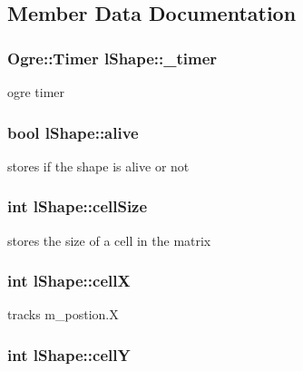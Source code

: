 \subsection{Member Data Documentation}
\hypertarget{classl_shape_a04043b68e92f96f681a82cbcaea48663}{
\subsubsection[{\-\_\-timer}]{\setlength{\rightskip}{0pt plus 5cm}Ogre\-::\-Timer l\-Shape\-::\-\_\-timer}}\label{classl_shape_a04043b68e92f96f681a82cbcaea48663}
ogre timer \hypertarget{classl_shape_ab9c57360b754bd499a55074a29437f5e}{
\subsubsection[{alive}]{\setlength{\rightskip}{0pt plus 5cm}bool l\-Shape\-::alive}}\label{classl_shape_ab9c57360b754bd499a55074a29437f5e}
stores if the shape is alive or not \hypertarget{classl_shape_aa3d3ef832437b8cfd098fb0138884b48}{
\subsubsection[{cell\-Size}]{\setlength{\rightskip}{0pt plus 5cm}int l\-Shape\-::cell\-Size}}\label{classl_shape_aa3d3ef832437b8cfd098fb0138884b48}
stores the size of a cell in the matrix \hypertarget{classl_shape_ab48fe215855332a414a9930a6dae359c}{
\subsubsection[{cell\-X}]{\setlength{\rightskip}{0pt plus 5cm}int l\-Shape\-::cell\-X}}\label{classl_shape_ab48fe215855332a414a9930a6dae359c}
tracks m\-\_\-postion.\-X \hypertarget{classl_shape_af4e268d18f4fd440f8b48b0fe87bdf00}{
\subsubsection[{cell\-Y}]{\setlength{\rightskip}{0pt plus 5cm}int l\-Shape\-::cell\-Y}}\label{classl_shape_af4e268d18f4fd440f8b48b0fe87bdf00}
